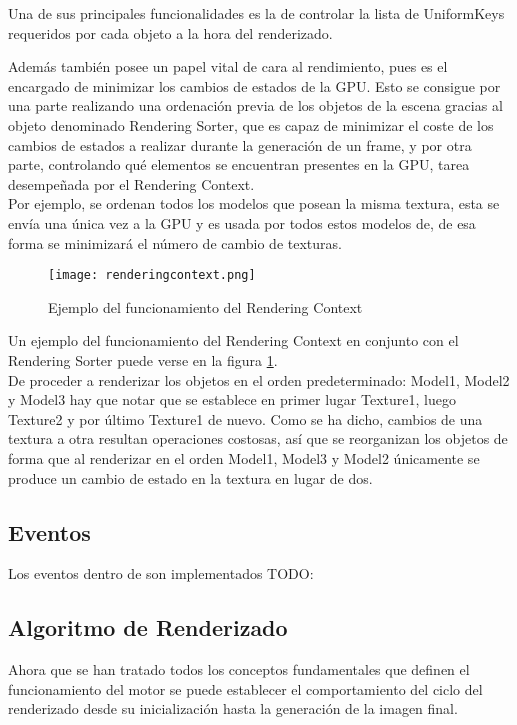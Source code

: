 Una de sus principales funcionalidades es la de controlar la lista de UniformKeys requeridos por cada objeto a la hora del renderizado.

Además también posee un papel vital de cara al rendimiento, pues es el encargado de minimizar los cambios de estados de la GPU. Esto se consigue por una parte realizando una ordenación previa de los objetos de la escena gracias al objeto denominado Rendering Sorter, que es capaz de minimizar el coste de los cambios de estados a realizar durante la generación de un frame, y por otra parte, controlando qué elementos se encuentran presentes en la GPU, tarea desempeñada por el Rendering Context.\\

Por ejemplo, se ordenan todos los modelos que posean la misma textura, esta se envía una única vez a la GPU y es usada por todos estos modelos de, de esa forma se minimizará el número de cambio de texturas.\\

\begin{figure}[h!]
\begin{center}
\texttt{[image: renderingcontext.png]}
\end{center}
\caption[Ejemplo del funcionamiento del Rendering Context]{Ejemplo del funcionamiento del Rendering Context}
\label{fig:renderingcontext}
\end{figure}

Un ejemplo del funcionamiento del Rendering Context en conjunto con el Rendering Sorter puede verse en la figura \ref{fig:renderingcontext}.\\
De proceder a renderizar los objetos en el orden predeterminado: Model1, Model2 y Model3 hay que notar que se establece en primer lugar Texture1, luego Texture2 y por último Texture1 de nuevo. Como se ha dicho, cambios de una textura a otra resultan operaciones costosas, así que se reorganizan los objetos de forma que al renderizar en el orden Model1, Model3 y Model2 únicamente se produce un cambio de estado en la textura en lugar de dos.

\subsection{Eventos}
Los eventos dentro de \robotto son implementados 
TODO:

\subsection{Algoritmo de Renderizado}
Ahora que se han tratado todos los conceptos fundamentales que definen el funcionamiento del motor se puede establecer el comportamiento del ciclo del renderizado desde su inicialización hasta la generación de la imagen final.\\

